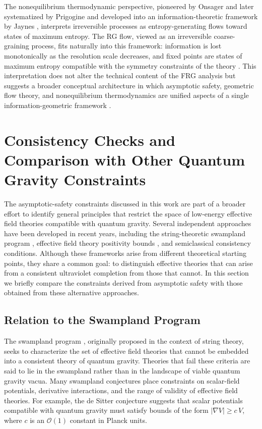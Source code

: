 \documentclass[12pt,a4paper]{article}
\begin{document}
The nonequilibrium thermodynamic perspective, pioneered by Onsager
\cite{Onsager1931} and later systematized by Prigogine \cite{Prigogine1967}
and developed into an information-theoretic framework by Jaynes \cite{Jaynes1957},
interprets irreversible processes as entropy-generating flows toward states of
maximum entropy. The RG flow, viewed as an irreversible coarse-graining
process, fits naturally into this framework: information is lost monotonically
as the resolution scale decreases, and fixed points are states of maximum
entropy compatible with the symmetry constraints of the theory
\cite{Amari2016,AmariNagaoka2000}. This interpretation does not alter the
technical content of the FRG analysis but suggests a broader conceptual
architecture in which asymptotic safety, geometric flow theory, and
nonequilibrium thermodynamics are unified aspects of a single information-geometric
framework \cite{Ruppeiner1995,Fisher1922}.

\section{Consistency Checks and Comparison with Other Quantum Gravity Constraints}

The asymptotic-safety constraints discussed in this work are part of a broader
effort to identify general principles that restrict the space of low-energy
effective field theories compatible with quantum gravity. Several independent
approaches have been developed in recent years, including the string-theoretic
swampland program \cite{EichhornHebeckerPawlowskiWalcher2024}, effective field
theory positivity bounds \cite{EichhornSchifferPedersen2025}, and semiclassical
consistency conditions. Although these frameworks arise from different
theoretical starting points, they share a common goal: to distinguish effective
theories that can arise from a consistent ultraviolet completion from those that
cannot. In this section we briefly compare the constraints derived from
asymptotic safety with those obtained from these alternative approaches.

\subsection{Relation to the Swampland Program}

The swampland program \cite{EichhornHebeckerPawlowskiWalcher2024}, originally
proposed in the context of string theory, seeks to characterize the set of
effective field theories that cannot be embedded into a consistent theory of
quantum gravity. Theories that fail these criteria are said to lie in the
swampland rather than in the landscape of viable quantum gravity vacua. Many
swampland conjectures place constraints on scalar-field potentials, derivative
interactions, and the range of validity of effective field theories. For
example, the de Sitter conjecture suggests that scalar potentials compatible
with quantum gravity must satisfy bounds of the form $|\nabla V| \geq c\,V$,
where $c$ is an $\mathcal{O}(1)$ constant in Planck units.
\end{document}
